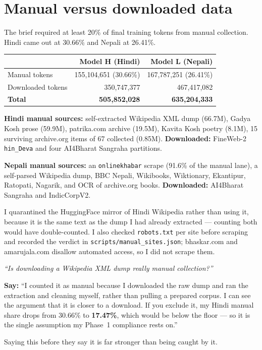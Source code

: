 \documentclass[11pt]{report}
\begin{document}
\section{Manual versus downloaded data}

The brief required at least 20\% of final training tokens from manual
collection. Hindi came out at 30.66\% and Nepali at 26.41\%.

\begin{center}\small
\begin{tabular}{lrr}
\toprule
& \textbf{Model H (Hindi)} & \textbf{Model L (Nepali)} \\
\midrule
Manual tokens & 155,104,651 (30.66\%) & 167,787,251 (26.41\%) \\
Downloaded tokens & 350,747,377 & 467,417,082 \\
\textbf{Total} & \textbf{505,852,028} & \textbf{635,204,333} \\
\bottomrule
\end{tabular}
\end{center}

\textbf{Hindi manual sources:} self-extracted Wikipedia XML dump (66.7M), Gadya
Kosh prose (59.9M), patrika.com archive (19.5M), Kavita Kosh poetry (8.1M), 15
surviving archive.org items of 67 collected (0.85M). \textbf{Downloaded:}
FineWeb-2 \texttt{hin\_Deva} and four AI4Bharat Sangraha partitions.

\textbf{Nepali manual sources:} an \texttt{onlinekhabar} scrape (91.6\% of the
manual lane), a self-parsed Wikipedia dump, BBC Nepali, Wikibooks, Wiktionary,
Ekantipur, Ratopati, Nagarik, and OCR of archive.org books.
\textbf{Downloaded:} AI4Bharat Sangraha and IndicCorpV2.

\begin{deeper}
I quarantined the HuggingFace mirror of Hindi Wikipedia rather than using it,
because it is the same text as the dump I had already extracted --- counting
both would have double-counted. I also checked \texttt{robots.txt} per site
before scraping and recorded the verdict in
\texttt{scripts/manual\_sites.json}; bhaskar.com and amarujala.com disallow
automated access, so I did not scrape them.
\end{deeper}

\begin{trap}
\textit{``Is downloading a Wikipedia XML dump really manual collection?''}

\medskip
\textbf{Say:} ``I counted it as manual because I downloaded the raw dump and ran
the extraction and cleaning myself, rather than pulling a prepared corpus. I
can see the argument that it is closer to a download. If you exclude it, my
Hindi manual share drops from 30.66\% to \textbf{17.47\%}, which would be below
the floor --- so it is the single assumption my Phase~1 compliance rests on.''

\medskip
Saying this before they say it is far stronger than being caught by it.
\end{trap}
\end{document}
